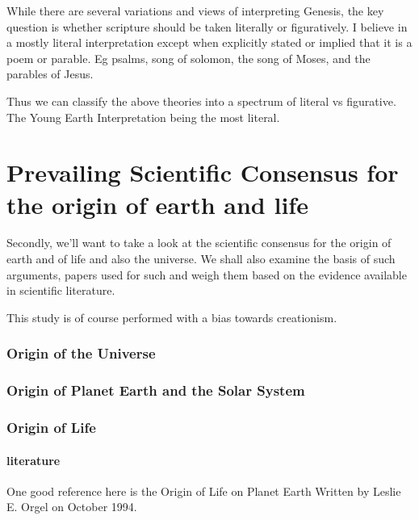 \documentclass[11]{article}
\begin{document}
While there are several variations and views of interpreting Genesis, the key question is whether scripture should be taken literally or figuratively. I believe in a mostly literal interpretation except when explicitly stated or implied that it is a poem or parable. Eg psalms, song of solomon, the song of Moses, and the parables of Jesus. 

Thus we can classify the above theories into a spectrum of literal vs figurative. The Young Earth Interpretation being the most literal. 

\part{Prevailing Scientific Consensus for the origin of earth and life}

Secondly, we'll want to take a look at the scientific consensus for the origin of earth and of life and also the universe. We shall also examine the basis of such arguments, papers used for such and weigh them based on the evidence available in scientific literature.

This study is of course performed with a bias towards creationism.

\section{Origin of the Universe}

\section{Origin of Planet Earth and the Solar System}



\section{Origin of Life}

\subsection{literature}

One good reference here is the Origin of Life on Planet Earth Written by Leslie E. Orgel on October 1994.
\end{document}
